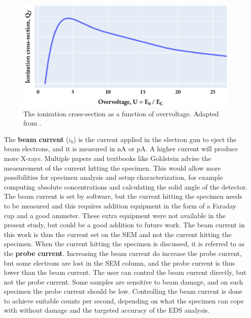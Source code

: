 \begin{figure}[hbt]
    \centering
    \includegraphics[width=0.65\linewidth]{figures/overvoltage2ionizationcrosssection.pdf}
    \caption{
        The ionization cross-section as a function of overvoltage.
        Adapted from \cite[Fig. 4.4]{williams_carter_tem_2009}.
    }
    \label{fig:overvoltage2ionizationcrosssection}
\end{figure}








The \textbf{beam current} ($i_b$) is the current applied in the electron gun to eject the beam electrons, and it is measured in nA or pA.
A higher current will produce more X-rays.
Multiple papers and textbooks like Goldstein advise the measurement of the current hitting the specimen.
This would allow more possibilities for specimen analysis and setup characterization, for example computing absolute concentrations and calculating the solid angle of the detector.
The beam current is set by software, but the current hitting the specimen needs to be measured and this requires addition equipment in the form of a Faraday cup and a good ammeter.
These extra equipment were not available in the present study, but could be a good addition to future work.
The beam current in this work is thus the current set on the SEM and not the current hitting the specimen.
When the current hitting the specimen is discussed, it is referred to as the \textbf{probe current}.
Increasing the beam current do increase the probe current, but some electrons are lost in the SEM column, and the probe current is thus lower than the beam current.
The user can control the beam current directly, but not the probe current.
Some samples are sensitive to beam damage, and on such specimen the probe current should be low.
Controlling the beam current is done to achieve suitable counts per second, depending on what the specimen can cope with without damage and the targeted accuracy of the EDS analysis.


